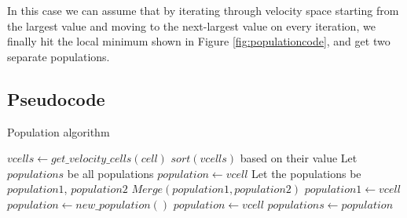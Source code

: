 \documentclass[a4paper,10pt]{article}
\begin{document}
In this case we can assume that by iterating through velocity space starting from the largest value and moving to the next-largest value on every iteration, we finally hit the local minimum 
shown in Figure \ref{fig:populationcode}, and get two separate populations.

\subsection{Pseudocode}

\begin{algorithm}
 \label{pseudo:population}
 \caption{Population algorithm}
\begin{algorithmic}[1]
  \State $vcells \gets get\_velocity\_cells(cell)$
  \State $sort(vcells)$ based on their value
  \State Let $populations$ be all populations
     \State $population \gets vcell$
     \State Let the populations be $population1$, $population2$
      \State $Merge(population1, population2)$
     \Else
      \State $population1 \gets vcell$
     \EndIf
    \EndIf
   \Else
    \State $population \gets new\_population()$
    \State $population \gets vcell$
    \State $populations \gets population$
   \EndIf
  \EndFor
 \EndFunction
\end{algorithmic}
\end{algorithm}
\end{document}
